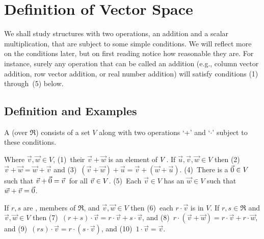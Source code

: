 \section{Definition of Vector Space}
We shall study structures with two operations,
an addition and a scalar multiplication, that are subject to some
simple conditions.
We will reflect more on the conditions later,
but on first reading notice how reasonable they are.
For instance, surely any operation that can be called an addition
(e.g., column vector addition, row vector addition, or
real number addition) will satisfy conditions (1) through~(5) below.




\subsection{Definition and Examples}

\begin{definition}
\label{def:VecSpace}
A 
(over \( \Re \)) consists of a set \( V \) along with
two operations `+' and `\( \cdot \)' subject to these conditions.

Where \( \vec{v},\vec{w}\in V \), 
(1)~their %
     \( \vec{v}+\vec{w} \) is an element of \( V\/\).
If \( \vec{u},\vec{v},\vec{w}\in V \) then 
(2)~\( \vec{v}+\vec{w}=\vec{w}+\vec{v} \) and 
(3)~\( (\vec{v}+\vec{w})+\vec{u}=\vec{v}+(\vec{w}+\vec{u}) \).
(4)~There is a %
    \( \vec{0}\in V \) such that
    \( \vec{v}+\vec{0}=\vec{v}\, \) for all \( \vec{v}\in V\/ \).
(5)~Each \( \vec{v}\in V \) has an
    \( \vec{w}\in V \) such that \( \vec{w}+\vec{v}=\vec{0} \).

If \( r,s \) are ,
members of \( \Re \),
and \( \vec{v},\vec{w}\in V \) then 
(6)~each
%
     \( r\cdot\vec{v} \) is in \( V \).
If \( r,s\in\Re \) and \( \vec{v},\vec{w}\in V \) then
(7)~\( (r+s)\cdot\vec{v}=r\cdot\vec{v}+s\cdot\vec{v} \), 
and (8)~\( r\cdot(\vec{v}+\vec{w})
               =r\cdot\vec{v}+r\cdot\vec{w} \),
and (9)~\( (rs)\cdot\vec{v} =r\cdot(s\cdot\vec{v}) \),
and (10)~\( 1\cdot\vec{v}=\vec{v} \).
\end{definition}

